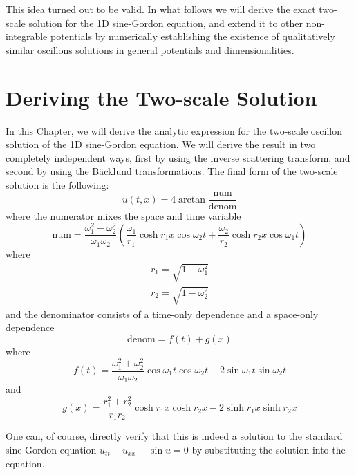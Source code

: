 \documentclass{report}
\begin{document}
This idea turned out to be valid. In what follows we will derive the exact two-scale solution for the 1D sine-Gordon equation, and extend it to other non-integrable potentials by numerically establishing the existence of qualitatively similar oscillons solutions in general potentials and dimensionalities.

\chapter{Deriving the Two-scale Solution}
In this Chapter, we will derive the analytic expression for the two-scale oscillon solution of the 1D sine-Gordon equation. We will derive the result in two completely independent ways, first by using the inverse scattering transform, and second by using the B\"acklund transformations. The final form of the two-scale solution is the following:
\begin{equation}\label{twoscale}
  u(t,x)=4 \arctan \frac{\textrm{num}}{\textrm{denom}}
\end{equation}
where the numerator mixes the space and time variable
\begin{equation}\label{num}
  \textrm{num} = \frac{\omega_1^2-\omega_2^2}{\omega_1 \omega_2} \left(\frac{\omega_1}{r_1} \cosh r_1 x \cos\omega_2 t + \frac{\omega_2}{r_2} \cosh r_2 x \cos\omega_1 t \right)
\end{equation}
where
\begin{subequations}
  \begin{align}
  r_1=\sqrt{1-\omega_1^2}\\
  r_2=\sqrt{1-\omega_2^2}
  \end{align}
\end{subequations}
and the denominator consists of a time-only dependence and a space-only dependence
\begin{equation}
    \textrm{denom} = f(t) + g(x)
\end{equation}
where
\begin{equation}\label{denomf}
  f(t) = \frac{\omega_1^2+\omega_2^2}{\omega_1 \omega_2} \cos \omega_1 t \cos \omega_2 t +2 \sin \omega_1 t \sin \omega_2 t
\end{equation}
and
\begin{equation}\label{denomg}
  g(x) = \frac{r_1^2+r_2^2}{r_1 r_2} \cosh r_1 x \cosh r_2 x-2  \sinh r_1 x \sinh r_2 x
\end{equation}

One can, of course, directly verify that this is indeed a solution to the standard sine-Gordon equation $u_{tt}-u_{xx}+\sin u=0$ by substituting the solution into the equation.
\end{document}
